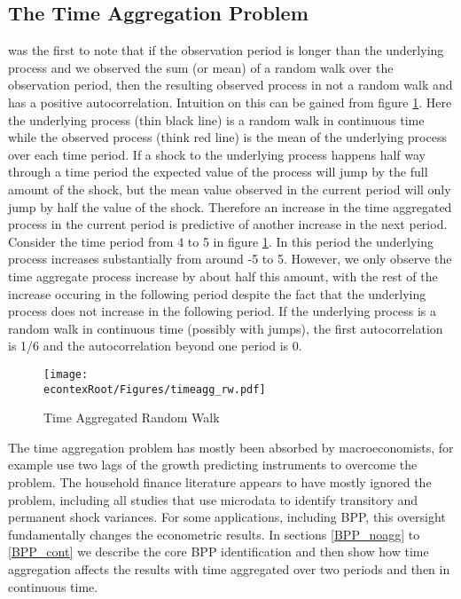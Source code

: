 \documentclass[titlepage]{\econtex}\newcommand{\texname}{IncomeUncertainty}
\begin{document}
\subsection{The Time Aggregation Problem}
\cite{working_note_1960} was the first to note that if the observation period is longer than the underlying process and we observed the sum (or mean) of a random walk over the observation period, then the resulting observed process in not a random walk and has a positive autocorrelation. Intuition on this can be gained from figure \ref{fig:TimeAgg}. Here the underlying process (thin black line) is a random walk in continuous time while the observed process (think red line) is the mean of the underlying process over each time period. If a shock to the underlying process happens half way through a time period the expected value of the process will jump by the full amount of the shock, but the mean value observed in the current period will only jump by half the value of the shock. Therefore an increase in the time aggregated process in the current period is predictive of another increase in the next period. Consider the time period from 4 to 5 in figure \ref{fig:TimeAgg}. In this period the underlying process increases substantially from around -5 to 5. However, we only observe the time aggregate process increase by about half this amount, with the rest of the increase occuring in the following period despite the fact that the underlying process does not increase in the following period. If the underlying process is a random walk in continuous time (possibly with jumps), the first autocorrelation is 1/6 and the autocorrelation beyond one period is 0.
	\begin{figure} 
	\begin{centering}
		\texttt{[image: \\econtexRoot/Figures/timeagg\_rw.pdf]} 
		\caption{Time Aggregated Random Walk}
		\label{fig:TimeAgg}
	\end{centering}
\end{figure}
The time aggregation problem has mostly been absorbed by macroeconomists, for example \cite{campbell_consumption_1989} use two lags of the growth predicting instruments to overcome the problem. The household finance literature appears to have mostly ignored the problem, including all studies that use microdata to identify transitory and permanent shock variances. For some applications, including BPP, this oversight fundamentally changes the econometric results. In sections \ref{BPP_noagg} to \ref{BPP_cont} we describe the core BPP identification and then show how time aggregation affects the results with time aggregated over two periods and then in continuous time.
\end{document}
